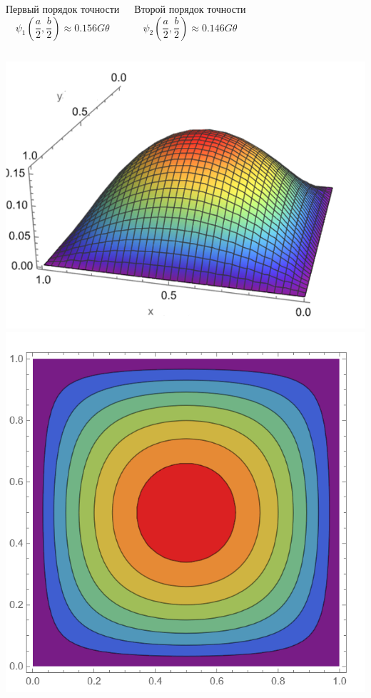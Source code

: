 \documentclass[ignoreonframetext,unicode]{beamer}
\begin{document}
\begin{frame}{}

		\begin{columns}
	\begin{block}{Первый порядок точности}	
		\[
			\psi_1\left(\frac{a}{2}, \frac{b}{2}\right) \approx 0.156 G \theta
		\]
	\end{block}
	\begin{block}{Второй порядок точности}	
		\[
		\psi_2\left(\frac{a}{2}, \frac{b}{2}\right) \approx 0.146 G \theta
		\]
	\end{block}
\end{columns}

	\begin{columns}
	\includegraphics[width=\textwidth]{ritz_graph}%
	\includegraphics[width=\textwidth]{ritz_levels}%
\end{columns}
\end{frame}
\end{document}
